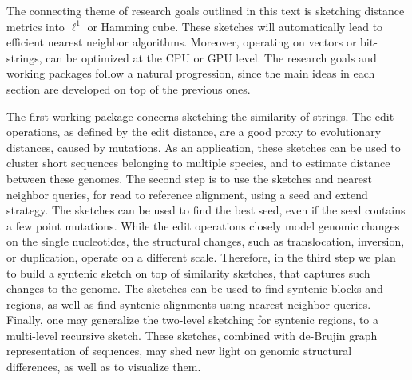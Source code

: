 The connecting theme of research goals outlined in this text is sketching distance metrics into $\ell^1$ or Hamming cube. These sketches will automatically lead to efficient nearest neighbor algorithms. Moreover, operating on vectors or bit-strings, can be optimized at the CPU or GPU level. The research goals and working packages follow a natural progression, since the main ideas in each section are developed on top of the previous ones. 


The first working package concerns sketching the similarity of strings. The edit operations, as defined by the edit distance, are a good proxy to evolutionary distances, caused by mutations. As an application, these sketches can be used to cluster short sequences belonging to multiple species, and to estimate distance between these genomes. The second step is to use the sketches and nearest neighbor queries, for read to reference alignment, using a seed and extend strategy. The sketches can be used to find the best seed, even if the seed contains a few point mutations. While the edit operations closely model genomic changes on the single nucleotides, the structural changes, such as translocation, inversion, or duplication, operate on a different scale. Therefore, in the third step we plan to build a syntenic sketch on top of similarity sketches, that captures such changes to the genome. The sketches can be used to find syntenic blocks and regions, as well as find syntenic alignments using nearest neighbor queries. Finally, one may generalize the two-level sketching for syntenic regions, to a multi-level recursive sketch. These sketches, combined with de-Brujin graph representation of sequences, may shed new light on genomic structural differences, as well as to visualize them. 


